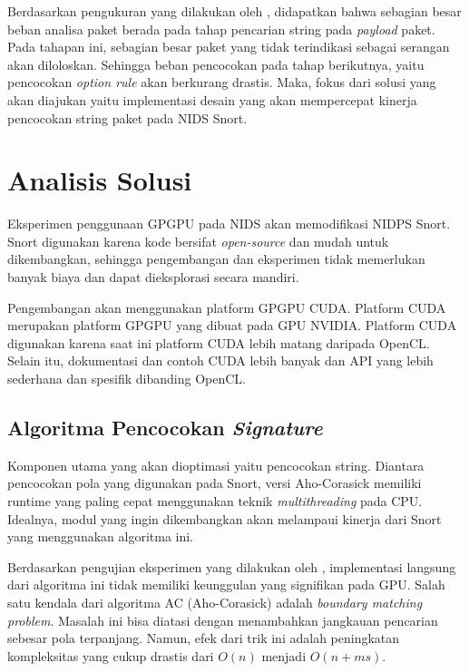 
    Berdasarkan pengukuran yang dilakukan oleh \cite{kargus2012}, didapatkan bahwa sebagian besar beban analisa paket berada pada tahap pencarian string pada \emph{payload} paket. Pada tahapan ini, sebagian besar paket yang tidak terindikasi sebagai serangan akan diloloskan. Sehingga beban pencocokan pada tahap berikutnya, yaitu pencocokan \emph{option rule} akan berkurang drastis. Maka, fokus dari solusi yang akan diajukan yaitu implementasi desain yang akan mempercepat kinerja pencocokan string paket pada NIDS Snort.

  \section{Analisis Solusi}

    Eksperimen penggunaan GPGPU pada NIDS akan memodifikasi NIDPS Snort. Snort digunakan karena kode bersifat \emph{open-source} dan mudah untuk dikembangkan, sehingga pengembangan dan eksperimen tidak memerlukan banyak biaya dan dapat dieksplorasi secara mandiri. 

    Pengembangan akan menggunakan platform GPGPU CUDA. Platform CUDA merupakan platform GPGPU yang dibuat pada GPU NVIDIA. Platform CUDA digunakan karena saat ini platform CUDA lebih matang daripada OpenCL. Selain itu, dokumentasi dan contoh CUDA lebih banyak dan API yang lebih sederhana dan spesifik dibanding OpenCL.

    \subsection{Algoritma Pencocokan \emph{Signature}}

      Komponen utama yang akan dioptimasi yaitu pencocokan string. Diantara pencocokan pola yang digunakan pada Snort, versi Aho-Corasick memiliki runtime yang paling cepat menggunakan teknik \emph{multithreading} pada CPU. Idealnya, modul yang ingin dikembangkan akan melampaui kinerja dari Snort yang menggunakan algoritma ini.
      
      Berdasarkan pengujian eksperimen yang dilakukan oleh \cite{lin2013}, implementasi langsung dari algoritma ini tidak memiliki keunggulan yang signifikan pada GPU. Salah satu kendala dari algoritma AC (Aho-Corasick) adalah \emph{boundary matching problem}. Masalah ini bisa diatasi dengan menambahkan jangkauan pencarian sebesar pola terpanjang. Namun, efek dari trik ini adalah peningkatan kompleksitas yang cukup drastis dari $O(n)$ menjadi $O(n + ms)$. 
      
